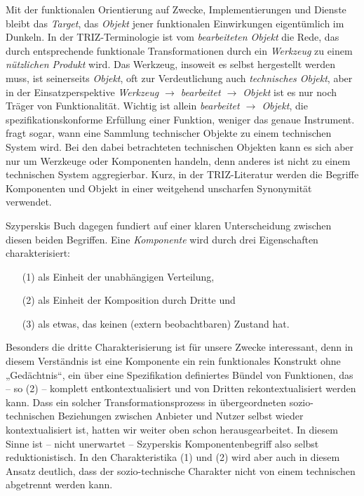 \documentclass[11pt,a4paper]{article}
\begin{document}
Mit der funktionalen Orientierung auf Zwecke, Implementierungen und Dienste
bleibt das \emph{Target}, das \emph{Objekt} jener funktionalen Einwirkungen
eigentümlich im Dunkeln. In der TRIZ-Terminologie ist vom \emph{bearbeiteten
  Objekt} die Rede, das durch entsprechende funktionale Transformationen durch
ein \emph{Werkzeug} zu einem \emph{nützlichen Produkt} wird. Das Werkzeug,
insoweit es selbst hergestellt werden muss, ist seinerseits \emph{Objekt}, oft
zur Verdeutlichung auch \emph{technisches Objekt}, aber in der
Einsatzperspektive \emph{Werkzeug $\to$ bearbeitet $\to$ Objekt} ist es nur
noch Träger von Funktionalität. Wichtig ist allein \emph{bearbeitet $\to$
  Objekt}, die spezifikationskonforme Erfüllung einer Funktion, weniger das
genaue Instrument. \cite{Shpakovsky2003} fragt sogar, wann eine Sammlung
technischer Objekte zu einem technischen System wird. Bei den dabei
betrachteten technischen Objekten kann es sich aber nur um Werzkeuge oder
Komponenten handeln, denn anderes ist nicht zu einem technischen System
aggregierbar. Kurz, in der TRIZ-Literatur werden die Begriffe Komponenten und
Objekt in einer weitgehend unscharfen Synonymität verwendet.

Szyperskis Buch \cite{Szyperski2002} dagegen fundiert auf einer klaren
Unterscheidung zwischen diesen beiden Begriffen. Eine \emph{Komponente} wird
durch drei Eigenschaften charakterisiert:
\begin{itemize}
\item[(1)] als Einheit der unabhängigen Verteilung,
\item[(2)] als Einheit der Komposition durch Dritte und
\item[(3)] als etwas, das keinen (extern beobachtbaren) Zustand hat.
\end{itemize}
Besonders die dritte Charakterisierung ist für unsere Zwecke interessant, denn
in diesem Verständnis ist eine Komponente ein rein funktionales Konstrukt ohne
„Gedächtnis“, ein über eine Spezifikation definiertes Bündel von Funktionen,
das -- so (2) -- komplett entkontextualisiert und von Dritten
rekontextualisiert werden kann.  Dass ein solcher Transformationsprozess in
übergeordneten sozio-technischen Beziehungen zwischen Anbieter und Nutzer
selbst wieder kontextualisiert ist, hatten wir weiter oben schon
herausgearbeitet.  In diesem Sinne ist -- nicht unerwartet -- Szyperskis
Komponentenbegriff also selbst reduktionistisch.  In den Charakteristika (1)
und (2) wird aber auch in diesem Ansatz deutlich, dass der sozio-technische
Charakter nicht von einem technischen abgetrennt werden kann.
\end{document}
